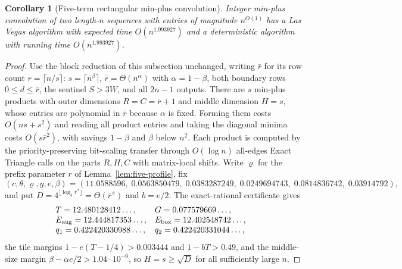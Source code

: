 \documentclass[11pt]{article}
\newtheorem{corollary}[theorem]{Corollary}
\begin{document}
\begin{corollary}[Five-term rectangular min-plus convolution]
\label{cor:five-convolution}
Integer min-plus convolution of two length-$n$ sequences with entries of
magnitude $n^{O(1)}$ has a Las Vegas algorithm with expected time
$O(n^{1.993927})$ and a deterministic algorithm with running time
$O(n^{1.993927})$.
\end{corollary}
\begin{proof}
Use the block reduction of this subsection unchanged, writing $\bar r$ for
its row count $r=\lceil n/s\rceil$: $s=\lceil n^\beta\rceil$,
$\bar r=\Theta(n^\alpha)$ with $\alpha=1-\beta$, both boundary rows
$0\le d\le\bar r$, the sentinel $S>3W$, and all $2n-1$ outputs. There are
$s$ min-plus products with outer dimensions $R=C=\bar r+1$ and middle
dimension $H=s$, whose entries are polynomial in $\bar r$ because $\alpha$ is
fixed. Forming them costs $O(ns+s^2)$ and reading all product entries and
taking the diagonal minima costs $O(s\bar r^2)$, with savings $1-\beta$ and
$\beta$ below $n^2$. Each product is computed by the priority-preserving
bit-scaling transfer through $O(\log n)$ all-edges Exact Triangle calls on
the parts $R,H,C$ with matrix-local shifts. Write $\varrho$ for the prefix
parameter $r$ of Lemma~\ref{lem:five-profile}, fix
\[
(c,\theta,\varrho,y,e,\beta)=
(11.0588596,\;0.0563850479,\;0.0383287249,\;0.0249694743,\;0.0814836742,\;0.03914792),
\]
and put $D=4^{\lfloor\log_4\bar r^{\,e}\rfloor}=\Theta(\bar r^{\,e})$ and
$b=e/2$. The exact-rational certificate gives
\[
\begin{array}{lll}
T=12.480128412\ldots,&G=0.077579669\ldots,&\\
E_{\rm aug}=12.444817353\ldots,&E_{\rm box}=12.402548742\ldots,&\\
q_1=0.422420330988\ldots,&q_2=0.422420331044\ldots,&
\end{array}
\]
the tile margins $1-e(T-1/4)>0.003444$ and $1-bT>0.49$, and the
middle-size margin $\beta-\alpha e/2>1.04\cdot10^{-6}$, so $H=s\ge\sqrt D$
for all sufficiently large $n$.


\end{proof}
\end{document}

